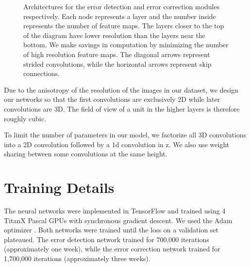 \documentclass{article}
\begin{document}
\begin{appendices}
\begin{figure}
\caption{Architectures for the error detection and error correction modules respectively. Each node represents a layer and the number inside represents the number of feature maps. The layers closer to the top of the diagram have lower resolution than the layers near the bottom. We make savings in computation by minimizing the number of high resolution feature maps. The diagonal arrows represent strided convolutions, while the horizontal arrows represent skip connections.}
\label{fig:architecture}
\end{figure}

Due to the anisotropy of the resolution of the images in our dataset, we design our networks so that the first convolutions are exclusively 2D while later convolutions are 3D. The field of view of a unit in the higher layers is therefore roughly cubic.

To limit the number of parameters in our model, we factorize all 3D convolutions into a 2D convolution followed by a 1d convolution in z. We also use weight sharing between some convolutions at the same height.


\section{Training Details}
The neural networks were implemented in TensorFlow \cite{tensorflow} and trained using 4 TitanX Pascal GPUs with synchronous gradient descent. We used the Adam optimizer \cite{adam}.   Both networks were trained until the loss on a validation set plateaued. The error detection network trained for 700,000 iterations (approximately one week), while the error correction network trained for 1,700,000 iterations (approximately three weeks).


\end{appendices}
\end{document}
